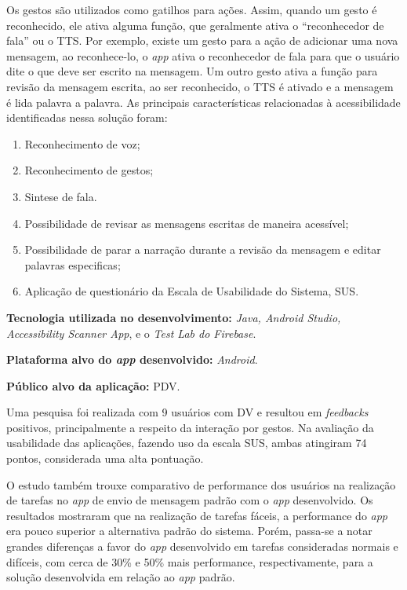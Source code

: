 Os gestos são utilizados como gatilhos para ações.
Assim, quando um gesto é reconhecido, ele ativa alguma função, que geralmente ativa o ``reconhecedor de fala'' ou o TTS\@.
Por exemplo, existe um gesto para a ação de adicionar uma nova mensagem, ao reconhece-lo, o \emph{app} ativa o reconhecedor de fala para que o usuário dite o que deve ser escrito na mensagem.
Um outro gesto ativa a função para revisão da mensagem escrita, ao ser reconhecido, o TTS é ativado e a mensagem é lida palavra a palavra.
As principais características relacionadas à acessibilidade identificadas nessa solução foram:

\begin{enumerate}
    \item Reconhecimento de voz;
    \item Reconhecimento de gestos;
    \item Sintese de fala.
    \item Possibilidade de revisar as mensagens escritas de maneira acessível;
    \item Possibilidade de parar a narração durante a revisão da mensagem e editar palavras especificas;
    \item Aplicação de questionário da Escala de Usabilidade do Sistema, SUS\@.
\end{enumerate}

\textbf{Tecnologia utilizada no desenvolvimento:} \emph{Java, Android Studio, Accessibility Scanner App}, e o \emph{Test Lab do Firebase}.

\textbf{Plataforma alvo do \emph{app} desenvolvido:} \emph{Android}.

\textbf{Público alvo da aplicação:} PDV\@.

Uma pesquisa foi realizada com 9 usuários com DV e resultou em \emph{feedbacks} positivos, principalmente a respeito da interação por gestos.
Na avaliação da usabilidade das aplicações, fazendo uso da escala SUS, ambas atingiram 74 pontos, considerada uma alta pontuação.

O estudo também trouxe comparativo de performance dos usuários na realização de tarefas no \emph{app} de envio de mensagem padrão com o \emph{app} desenvolvido.
Os resultados mostraram que na realização de tarefas fáceis, a performance do \emph{app} era pouco superior a alternativa padrão do sistema.
Porém, passa-se a notar grandes diferenças a favor do \emph{app} desenvolvido em tarefas consideradas normais e difíceis, com cerca de 30\% e 50\% mais performance, respectivamente, para a solução desenvolvida em relação ao \emph{app} padrão.

